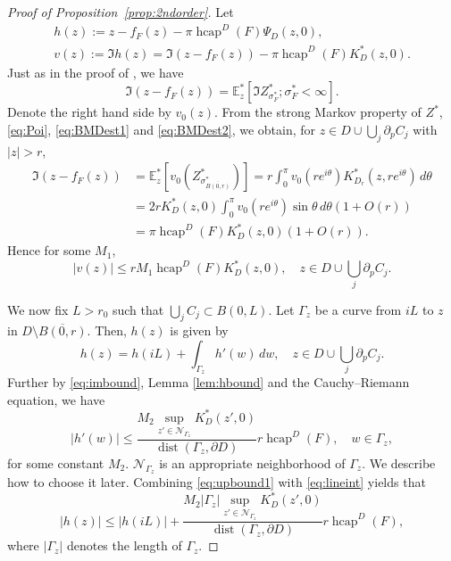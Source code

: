 \documentclass[preprint,12pt]{elsarticle}
\theoremstyle{definition}
\newcommand{\mean}[3]{\mathbb{E}^{#1}_{#2}\left[ #3 \right]}
\DeclareMathOperator{\dist}{dist}
\DeclareMathOperator{\hcap}{hcap}
\begin{document}
\begin{proof}[Proof of Proposition~\ref{prop:2ndorder}]
Let
\begin{gather*}
h(z):=z-f_F(z)-\pi\hcap^D(F)\Psi_D(z,0), \\
v(z):=\Im h(z)=\Im(z-f_F(z))-\pi\hcap^D(F)K^*_D(z,0).
\end{gather*}
Just as in the proof of \cite[Theorem~A.1]{CF18}, we have
\[
\Im(z-f_F(z)) = \mean{*}{z}{\Im Z^*_{\sigma^*_F}; \sigma^*_F<\infty}.
\]
Denote the right hand side by $v_0(z)$.
From the strong Markov property of $Z^*$, \eqref{eq:Poi},
\eqref{eq:BMDest1} and \eqref{eq:BMDest2}, we obtain,
for $z \in D \cup \bigcup_j \partial_p C_j$ with $\lvert z \rvert > r$,
\begin{align*}
\Im(z-f_F(z)) &= \mean{*}{z}{v_0\left(Z^*_{\sigma^*_{\overline{B(0,r)}}}\right)}
= r\int_0^{\pi} v_0(re^{i\theta})K^*_{D_r}(z, re^{i\theta})\,d\theta \\
&= 2rK^*_D(z,0)\int_0^{\pi}v_0(re^{i\theta})\sin\theta\, d\theta(1+O(r)) \\
&= \pi\hcap^D(F)K^*_D(z,0)(1+O(r)).
\end{align*}
Hence for some $M_1$,
\begin{equation} \label{eq:imbound}
\lvert v(z) \rvert \leq rM_1\hcap^D(F)K^*_D(z,0),
\quad z \in D \cup \bigcup_j \partial_p C_j.
\end{equation}

We now fix $L>r_0$ such that $\bigcup_j C_j \subset B(0,L)$.
Let $\Gamma_z$ be a curve from $iL$ to $z$ in $D \setminus \overline{B(0,r)}$.
Then, $h(z)$ is given by
\begin{equation} \label{eq:lineint}
h(z)=h(iL)+\int_{\Gamma_z}h'(w)\,dw,
\quad z \in D \cup \bigcup_j \partial_p C_j.
\end{equation}
Further by \eqref{eq:imbound}, Lemma \ref{lem:hbound} and
the Cauchy--Riemann equation, we have
\begin{equation} \label{eq:upbound1}
\lvert h'(w) \rvert \leq \frac{M_2\sup_{z' \in \mathcal{N}_{\Gamma_z}} K^*_D(z',0)}
{\dist(\Gamma_z, \partial D)}r\hcap^D(F), \quad w \in \Gamma_z,
\end{equation}
for some constant $M_2$.
$\mathcal{N}_{\Gamma_z}$ is an appropriate neighborhood of $\Gamma_z$.
We describe how to choose it later.
Combining \eqref{eq:upbound1} with \eqref{eq:lineint} yields that
\begin{equation} \label{eq:upbound2}
\lvert h(z) \rvert \leq \lvert h(iL) \rvert
+ \frac{M_2\lvert \Gamma_z \rvert \sup_{z' \in \mathcal{N}_{\Gamma_z}} K^*_D(z',0)}
	{\dist(\Gamma_z, \partial D)}r\hcap^D(F),
\end{equation}
where $\lvert \Gamma_z \rvert$ denotes the length of $\Gamma_z$.


\end{proof}
\end{document}
